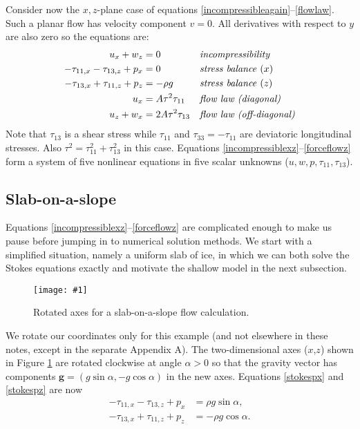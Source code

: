 \documentclass[letterpaper,final,12pt,reqno]{amsart}
\newcommand{\onefigsize}[3]{
\begin{figure}[ht]
\centering
\texttt{[image: \#1]}
\caption{#2}
\label{fig:#1}
\end{figure}}
\newcommand{\onefig}[2]{\onefigsize{#1}{#2}{3.0in}}
\begin{document}
Consider now the $x,z$-plane case of equations \eqref{incompressibleagain}--\eqref{flowlaw}.  Such a planar flow has velocity component $v=0$.  All derivatives with respect to $y$ are also zero so the equations are:
\begin{align}
u_x + w_z &= 0 &&\text{\emph{incompressibility}} \label{incompressiblexz} \\
- \tau_{11,x} - \tau_{13,z} + p_x &= 0 &&\text{\emph{stress balance} ($x$)} \label{stokespx} \\
- \tau_{13,x} + \tau_{11,z} + p_z &= - \rho g &&\text{\emph{stress balance} ($z$)} \label{stokespz} \\
u_x &= A \tau^2 \tau_{11} &&\text{\emph{flow law (diagonal)}}  \label{forceflowx} \\
u_z + w _x &= 2 A \tau^2 \tau_{13} &&\text{\emph{flow law (off-diagonal)}} \label{forceflowz}
\end{align}
Note that $\tau_{13}$ is a shear stress while $\tau_{11}$ and $\tau_{33}=-\tau_{11}$ are deviatoric longitudinal stresses.  Also $\tau^2 = \tau_{11}^2+\tau_{13}^2$ in this case.  Equations \eqref{incompressiblexz}--\eqref{forceflowz} form a system of five nonlinear equations in five scalar unknowns ($u,w,p,\tau_{11},\tau_{13}$).

\subsection*{Slab-on-a-slope}  Equations \eqref{incompressiblexz}--\eqref{forceflowz} are complicated enough to make us pause before jumping in to numerical solution methods.  We start with a simplified situation, namely a uniform slab of ice, in which we can both solve the Stokes equations exactly and motivate the shallow model in the next subsection.

\onefig{slab}{Rotated axes for a slab-on-a-slope flow calculation.}

We rotate our coordinates only for this example (and not elsewhere in these notes, except in the separate Appendix A).  The two-dimensional axes ($x$,$z$) shown in Figure \ref{fig:slab} are rotated clockwise at angle $\alpha>0$ so that the gravity vector has components $\mathbf{g} = (g \sin\alpha,- g \cos \alpha)$ in the new axes.  Equations \eqref{stokespx} and \eqref{stokespz} are now
\begin{align}
- \tau_{11,x} - \tau_{13,z} + p_x &= \rho g \sin\alpha, \label{stokespxrot} \\
- \tau_{13,x} + \tau_{11,z} + p_z &= - \rho g \cos\alpha. \label{stokespzrot}
\end{align}
\end{document}
